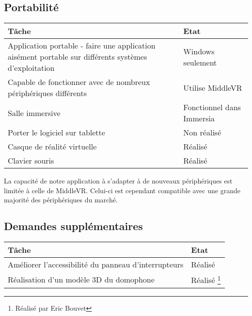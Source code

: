 \subsection{Portabilité}
\begin{tabular}{|p{}|p{}|}
	\hline
	Tâche & Etat \\ \hline
	Application portable - faire une application aisément portable sur différents systèmes d'exploitation& Windows seulement \\ \hline
	Capable de fonctionner avec de nombreux périphériques différents & Utilise MiddleVR \\ \hline
	Salle immersive & Fonctionnel dans Immersia \\ \hline
	Porter le logiciel sur tablette  & Non réalisé \\ \hline
	Casque de réalité virtuelle & Réalisé \\ \hline
	Clavier souris & Réalisé \\ \hline
\end{tabular}


La capacité de notre application à s'adapter à de nouveaux périphériques est limitée à celle de MiddleVR. Celui-ci est cependant compatible avec une grande majorité des périphériques du marché.

\subsection{Demandes supplémentaires}
\begin{tabular}{|p{}|p{}|}
	\hline
	Tâche & Etat \\ \hline
	Améliorer l'accessibilité du panneau d'interrupteurs & Réalisé \\ \hline
	Réalisation d'un modèle 3D du domophone & Réalisé \footnote{\samepage Réalisé par Eric Bouvet } \\ \hline
\end{tabular}
